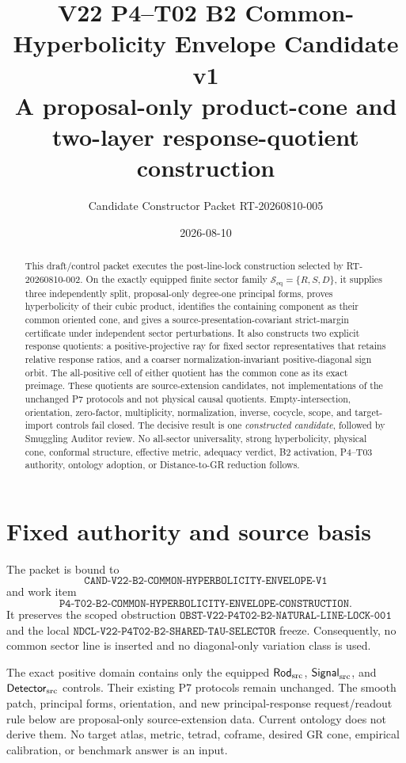 \documentclass[11pt]{article}
\title{V22 P4--T02 B2 Common-Hyperbolicity Envelope Candidate v1\\
\large A proposal-only product-cone and two-layer response-quotient construction}
\author{Candidate Constructor Packet RT-20260810-005}
\date{2026-08-10}
\newcommand{\Seq}{\mathcal S_{\mathrm{eq}}}
\begin{document}
\sloppy
\maketitle

\begin{abstract}
This draft/control packet executes the post-line-lock construction selected by
RT-20260810-002.  On the exactly equipped finite sector family
\(\Seq=\{R,S,D\}\), it supplies three independently split, proposal-only
degree-one principal forms, proves hyperbolicity of their cubic product,
identifies the containing component as their common oriented cone, and gives a
source-presentation-covariant strict-margin certificate under independent
sector perturbations.  It also constructs two explicit response quotients:
a positive-projective ray for fixed sector representatives that retains
relative response ratios, and a coarser normalization-invariant
positive-diagonal sign orbit.  The all-positive cell of either quotient has
the common cone as its exact preimage.  These quotients are source-extension
candidates, not implementations of the unchanged P7 protocols and not
physical causal quotients.  Empty-intersection, orientation, zero-factor,
multiplicity, normalization, inverse, cocycle, scope, and target-import
controls fail closed.  The decisive result is one \emph{constructed
candidate}, followed by Smuggling Auditor review.  No all-sector universality,
strong hyperbolicity, physical cone, conformal structure, effective metric,
adequacy verdict, B2 activation, P4--T03 authority, ontology adoption, or
Distance-to-GR reduction follows.
\end{abstract}

\section{Fixed authority and source basis}

The packet is bound to
\[
 \texttt{CAND-V22-B2-COMMON-HYPERBOLICITY-ENVELOPE-V1}
\]
and work item
\[
 \texttt{P4-T02-B2-COMMON-HYPERBOLICITY-ENVELOPE-CONSTRUCTION}.
\]
It preserves the scoped obstruction
\(\texttt{OBST-V22-P4T02-B2-NATURAL-LINE-LOCK-001}\) and the local
\(\texttt{NDCL-V22-P4T02-B2-SHARED-TAU-SELECTOR}\) freeze.  Consequently,
no common sector line is inserted and no diagonal-only variation class is
used.

The exact positive domain contains only the equipped
\(\mathsf{Rod}_{\rm src}\), \(\mathsf{Signal}_{\rm src}\), and
\(\mathsf{Detector}_{\rm src}\) controls.  Their existing P7 protocols remain
unchanged.  The smooth patch, principal forms, orientation, and new
principal-response request/readout rule below are proposal-only source-extension
data.  Current ontology does not derive them.  No target atlas, metric,
tetrad, coframe, desired GR cone, empirical calibration, or benchmark answer
is an input.
\end{document}
